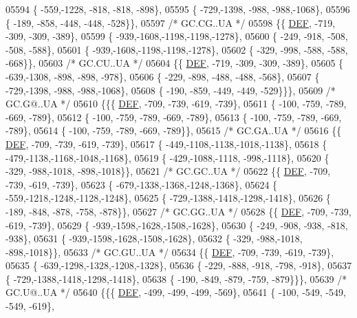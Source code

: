 \begin{DoxyCode}
05594 \{ -559,-1228, -818, -818, -898\},
05595 \{ -729,-1398, -988, -988,-1068\},
05596 \{ -189, -858, -448, -448, -528\}\},
05597 \textcolor{comment}{/* GC.CG..UA */}
05598 \{\{  \mbox{\hyperlink{1_88_84__epars_8h_a397419fc12b37ed479c8abb9d444d843}{DEF}}, -719, -309, -309, -389\},
05599 \{ -939,-1608,-1198,-1198,-1278\},
05600 \{ -249, -918, -508, -508, -588\},
05601 \{ -939,-1608,-1198,-1198,-1278\},
05602 \{ -329, -998, -588, -588, -668\}\},
05603 \textcolor{comment}{/* GC.CU..UA */}
05604 \{\{  \mbox{\hyperlink{1_88_84__epars_8h_a397419fc12b37ed479c8abb9d444d843}{DEF}}, -719, -309, -309, -389\},
05605 \{ -639,-1308, -898, -898, -978\},
05606 \{ -229, -898, -488, -488, -568\},
05607 \{ -729,-1398, -988, -988,-1068\},
05608 \{ -190, -859, -449, -449, -529\}\}\},
05609 \textcolor{comment}{/* GC.G@..UA */}
05610 \{\{\{  \mbox{\hyperlink{1_88_84__epars_8h_a397419fc12b37ed479c8abb9d444d843}{DEF}}, -709, -739, -619, -739\},
05611 \{ -100, -759, -789, -669, -789\},
05612 \{ -100, -759, -789, -669, -789\},
05613 \{ -100, -759, -789, -669, -789\},
05614 \{ -100, -759, -789, -669, -789\}\},
05615 \textcolor{comment}{/* GC.GA..UA */}
05616 \{\{  \mbox{\hyperlink{1_88_84__epars_8h_a397419fc12b37ed479c8abb9d444d843}{DEF}}, -709, -739, -619, -739\},
05617 \{ -449,-1108,-1138,-1018,-1138\},
05618 \{ -479,-1138,-1168,-1048,-1168\},
05619 \{ -429,-1088,-1118, -998,-1118\},
05620 \{ -329, -988,-1018, -898,-1018\}\},
05621 \textcolor{comment}{/* GC.GC..UA */}
05622 \{\{  \mbox{\hyperlink{1_88_84__epars_8h_a397419fc12b37ed479c8abb9d444d843}{DEF}}, -709, -739, -619, -739\},
05623 \{ -679,-1338,-1368,-1248,-1368\},
05624 \{ -559,-1218,-1248,-1128,-1248\},
05625 \{ -729,-1388,-1418,-1298,-1418\},
05626 \{ -189, -848, -878, -758, -878\}\},
05627 \textcolor{comment}{/* GC.GG..UA */}
05628 \{\{  \mbox{\hyperlink{1_88_84__epars_8h_a397419fc12b37ed479c8abb9d444d843}{DEF}}, -709, -739, -619, -739\},
05629 \{ -939,-1598,-1628,-1508,-1628\},
05630 \{ -249, -908, -938, -818, -938\},
05631 \{ -939,-1598,-1628,-1508,-1628\},
05632 \{ -329, -988,-1018, -898,-1018\}\},
05633 \textcolor{comment}{/* GC.GU..UA */}
05634 \{\{  \mbox{\hyperlink{1_88_84__epars_8h_a397419fc12b37ed479c8abb9d444d843}{DEF}}, -709, -739, -619, -739\},
05635 \{ -639,-1298,-1328,-1208,-1328\},
05636 \{ -229, -888, -918, -798, -918\},
05637 \{ -729,-1388,-1418,-1298,-1418\},
05638 \{ -190, -849, -879, -759, -879\}\}\},
05639 \textcolor{comment}{/* GC.U@..UA */}
05640 \{\{\{  \mbox{\hyperlink{1_88_84__epars_8h_a397419fc12b37ed479c8abb9d444d843}{DEF}}, -499, -499, -499, -569\},
05641 \{ -100, -549, -549, -549, -619\},

\end{DoxyCode}
